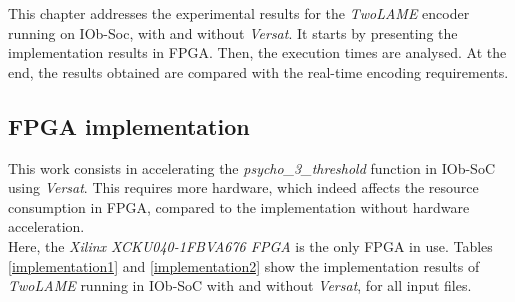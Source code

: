 \documentclass{article}
\begin{document}



This chapter addresses the experimental results for the \textit{TwoLAME} encoder running on IOb-Soc, with and without \textit{Versat}.
It starts by presenting the implementation results in FPGA. Then, the execution times are analysed. At the end, the results obtained are compared with the real-time encoding requirements.

\subsection{FPGA implementation}
This work consists in accelerating the \textit{psycho\_3\_threshold} function in IOb-SoC using \textit{Versat}. This requires more hardware, which indeed affects the resource consumption in FPGA, compared to the implementation without hardware acceleration.\\
Here, the \textit{Xilinx XCKU040-1FBVA676 FPGA} is the only FPGA in use. Tables \ref{implementation1} and \ref{implementation2} show the implementation results of \textit{TwoLAME} running in IOb-SoC with and without \textit{Versat}, for all input files.
\end{document}
